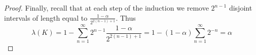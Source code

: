 \documentclass[11pt,a4paper]{article}
\begin{document}
\begin{proof}
    Finally, recall that at each step of the induction we remove
    $2^{n-1}$ disjoint intervals of length equal to
    $\frac{1-\alpha}{2^{2(n-1)+1}}$.  Thus
    \begin{equation*}
    \lambda(K) = 1 - \sum_{n=1}^{\infty} 2^{n-1}\frac{1-\alpha}{2^{2(n-1)+1}}
         = 1 - (1-\alpha)\sum_{n=1}^{\infty} 2^{-n}
         = \alpha
    \end{equation*}

\end{proof}
\end{document}
